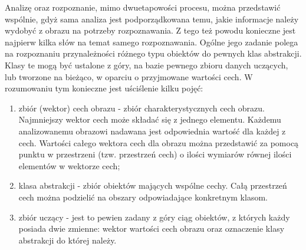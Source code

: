 Analizę oraz rozpoznanie, mimo dwuetapowości procesu, można przedstawić wspólnie, gdyż sama analiza jest podporządkowana temu, jakie informacje należy wydobyć z obrazu na potrzeby rozpoznawania. Z tego też powodu konieczne jest najpierw kilka słów na temat samego rozpoznawania. Ogólne jego zadanie polega na rozpoznaniu przynależności różnego typu obiektów do pewnych klas abstrakcji\cite{Tadeusiewicz_flasinski}. Klasy te mogą być ustalone z góry, na bazie pewnego zbioru danych uczących, lub tworzone na bieżąco, w oparciu o przyjmowane wartości cech. W rozumowaniu tym konieczne jest uściślenie kilku pojęć:
\begin{enumerate}
\item zbiór (wektor) cech obrazu - zbiór charakterystycznych cech obrazu. Najmniejszy wektor cech może składać się z jednego elementu. Każdemu analizowanemu obrazowi nadawana jest odpowiednia wartość dla każdej z cech. Wartości całego wektora cech dla obrazu można przedstawić za pomocą punktu w przestrzeni (tzw. przestrzeń cech) o ilości wymiarów równej ilości elementów w wektorze cech;
\item klasa abstrakcji - zbiór obiektów mających wspólne cechy. Całą przestrzeń cech można podzielić na obszary odpowiadające konkretnym klasom.
\item zbiór uczący - jest to pewien zadany z góry ciąg obiektów, z których każdy posiada dwie zmienne: wektor wartości cech obrazu oraz oznaczenie klasy abstrakcji do której należy\cite{Materka}.
\end{enumerate}